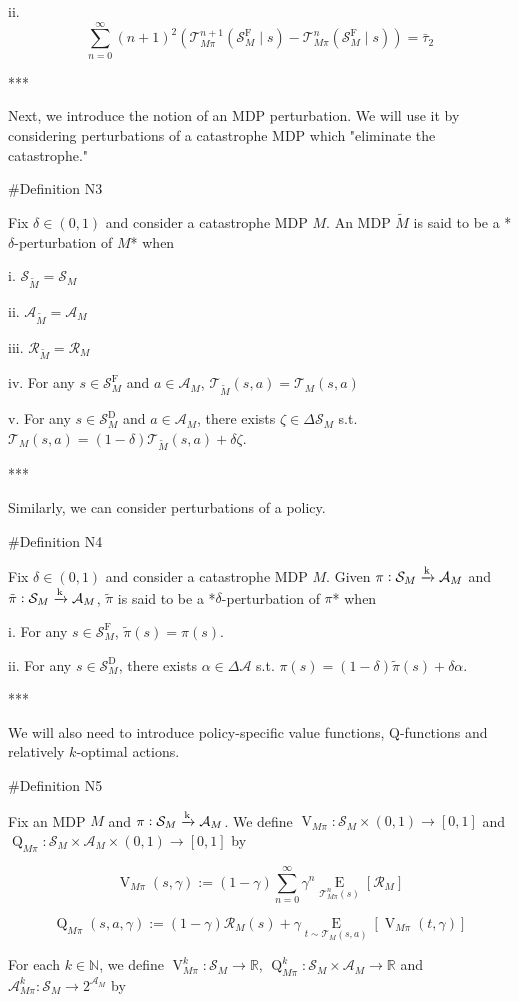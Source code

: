 \documentclass[a4paper]{article}
\newcommand{\AP}[1]{\left(#1\right)}
\newcommand{\AB}[1]{\left[#1\right]}
\newcommand{\Ea}[2]{\underset{#1}{\operatorname{E}}\AB{#2}}
\newcommand{\Nats}{\mathbb{N}}
\newcommand{\Reals}{\mathbb{R}}
\newcommand{\M}{\xrightarrow{\textnormal{k}}}
\newcommand{\A}{\mathcal{A}}
\newcommand{\St}{\mathcal{S}}
\newcommand{\T}{\mathcal{T}}
\newcommand{\R}{\mathcal{R}}
\newcommand{\RMD}{\mathrm{D}}
\newcommand{\RMF}{\mathrm{F}}
\newcommand{\SF}{\St^{\RMF}}
\newcommand{\SD}{\St^{\RMD}}
\newcommand{\V}{\operatorname{V}}
\newcommand{\Q}{\operatorname{Q}}
\begin{document}
ii. $$\sum_{n=0}^\infty (n+1)^2 \AP{\T_{M\pi}^{n+1}\AP{\SF_M \mid s}-\T_{M\pi}^{n}\AP{\SF_M \mid s}} = \bar{\tau}_2$$

***

Next, we introduce the notion of an MDP perturbation. We will use it by considering perturbations of a catastrophe MDP which "eliminate the catastrophe."

\#Definition N3

Fix $\delta\in(0,1)$ and consider a catastrophe MDP $M$. An MDP $\tilde{M}$ is said to be a *$\delta$-perturbation of $M$* when

i. $\St_{\tilde{M}} = \St_M$

ii. $\A_{\tilde{M}} = \A_M$

iii. $\R_{\tilde{M}}=\R_M$

iv. For any $s \in \SF_M$ and $a \in \A_M$, $\T_{\tilde{M}}\AP{s,a}=\T_{M}\AP{s,a}$

v. For any $s \in \SD_M$ and $a \in \A_M$, there exists $\zeta \in \Delta\St_M$ s.t. $\T_{M}\AP{s,a}=(1-\delta)\T_{\tilde{M}}\AP{s,a}+\delta\zeta$.

***

Similarly, we can consider perturbations of a policy.

\#Definition N4

Fix $\delta\in(0,1)$ and consider a catastrophe MDP $M$. Given $\pi: \St_M \M \A_M$ and $\tilde{\pi}: \St_M \M \A_M$, $\tilde{\pi}$ is said to be a *$\delta$-perturbation of $\pi$* when

i. For any $s \in \SF_M$, $\tilde{\pi}(s) = \pi(s)$.

ii. For any $s \in \SD_M$, there exists $\alpha\in\Delta\A$ s.t. $\pi(s)=(1-\delta)\tilde{\pi}(s)+\delta\alpha$.

***

We will also need to introduce policy-specific value functions, Q-functions and relatively $k$-optimal actions.

\#Definition N5

Fix an MDP $M$ and $\pi: \St_M \M \A_M$. We define $\V_{M\pi}: \St_M \times (0,1) \rightarrow [0,1]$ and $\Q_{M\pi}: \St_M \times \A_M \times (0,1) \rightarrow [0,1]$ by

$$\V_{M\pi}(s,\gamma) := (1-\gamma) \sum_{n=0}^\infty \gamma^n \Ea{\T_{M\pi}^n(s)}{\R_M}$$

$$\Q_{M\pi}(s,a,\gamma) := (1-\gamma) \R_M(s) + \gamma \Ea{t \sim \T_{M}(s,a)}{\V_{M\pi}(t,\gamma)}$$

For each $k \in \Nats$, we define $\V_{M\pi}^k: \St_M \rightarrow \Reals$, $\Q_{M\pi}^k: \St_M \times \A_M \rightarrow \Reals$ and $\A_{M\pi}^k: \St_M \rightarrow 2^{\A_M}$ by
\end{document}
